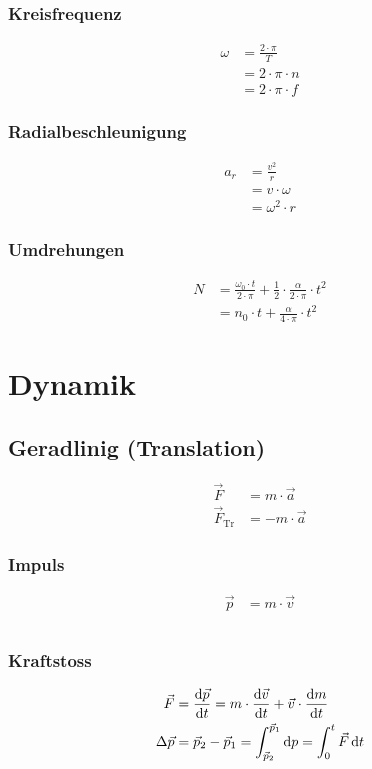 \begin{multicols}{2}{}
\subsubsection{Kreisfrequenz}
\begin{align*}
\omega&=\frac{2\cdot\pi}{T}\\
&=2\cdot\pi\cdot n \\
&=2\cdot\pi\cdot f
\end{align*}


\subsubsection{Radialbeschleunigung}
\begin{align*}
a_r&=\frac{v^2}{r}\\
&=v\cdot\omega\\
&=\omega^2\cdot r
\end{align*}
\end{multicols}


\subsubsection{Umdrehungen}
\begin{align*}
N&=\frac{\omega_0\cdot t}{2\cdot \pi}+\frac{1}{2}\cdot\frac{\alpha}{2\cdot \pi}\cdot t^2\\
&=n_0\cdot t+\frac{\alpha}{4\cdot\pi}\cdot t^2
\end{align*}


\newpage
\section{Dynamik}

\subsection{Geradlinig (Translation)}
\begin{align*}
\vec{F}&=m\cdot \vec{a}\\
\vec{F}_{\text{Tr}}&=-m\cdot \vec{a}
\end{align*}
\begin{multicols}{2}{}
\subsubsection{Impuls}
\begin{align*}
\vec{p}&=m\cdot \vec{v}\\ \\
\end{align*}

\subsubsection{Kraftstoss}
\begin{align*}
\vec{F}&=\frac{\diff \vec{p}}{\diff t}=m\cdot\frac{\diff \vec{v}}{\diff t}+\vec{v}\cdot\frac{\diff m}{\diff t}\\
\Delta\vec{p}&=\vec{p}_2-\vec{p}_1=\int_{\vec{p}_2}^{\vec{p}_1}\diff p=\int_0^{t}\vec{F}\diff t
\end{align*}
\end{multicols}

